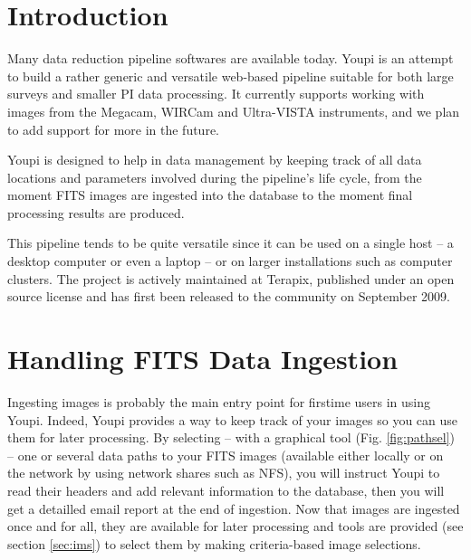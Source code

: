 \documentclass[11pt,twoside]{article}  %
\begin{document}

\section{Introduction}

Many data reduction pipeline softwares are available today. Youpi is an attempt to
build a rather generic and versatile web-based pipeline suitable for both large 
surveys and smaller PI data processing. It currently supports working with images 
from the Megacam, WIRCam and Ultra-VISTA instruments, and we plan to add support 
for more in the future. 

Youpi is designed to help in data management by keeping track of all data locations 
and parameters involved during the pipeline's life cycle, from the moment FITS images 
are ingested into the database to the moment final processing results are produced.

This pipeline tends to be quite versatile since it can be used on a single host -- a 
desktop computer or even a laptop -- or on larger installations such as computer 
clusters. The project is actively maintained at Terapix, published under an open 
source license and has first been released to the community on September 2009.

\section{Handling FITS Data Ingestion}

Ingesting images is probably the main entry point for firstime users in using Youpi.
Indeed, Youpi provides a way to keep track of your images so you can use them for later 
processing. By selecting -- with a graphical tool (Fig. \ref{fig:pathsel}) -- 
one or several data paths to your FITS images (available either locally or on the 
network by using network shares such as NFS), you will instruct Youpi to read their 
headers and add relevant information to the database, then you will get a detailled 
email report at the end of ingestion. Now that images are ingested once and for all, 
they are available for later processing and tools are provided (see section \ref{sec:ims}) 
to select them by making criteria-based image selections.
\end{document}
